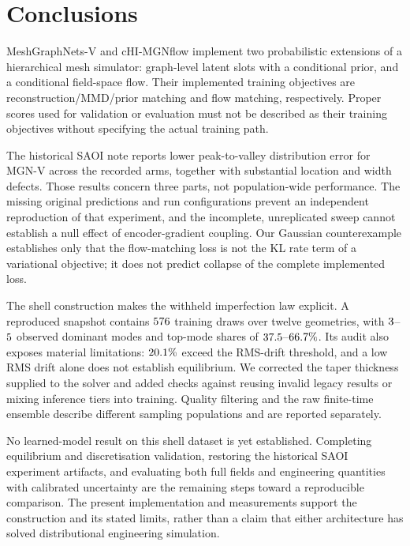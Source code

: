 \section{Conclusions}
\label{sec:conclusion}

MeshGraphNets-V and cHI-MGNflow implement two probabilistic extensions of a
hierarchical mesh simulator: graph-level latent slots with a conditional prior,
and a conditional field-space flow. Their implemented training objectives are
reconstruction/MMD/prior matching and flow matching, respectively. Proper
scores used for validation or evaluation must not be described as their
training objectives without specifying the actual training path.

The historical SAOI note reports lower peak-to-valley distribution error for
MGN-V across the recorded arms, together with substantial location and width
defects. Those results concern three parts, not population-wide performance.
The missing original predictions and run configurations prevent an independent
reproduction of that experiment, and the incomplete, unreplicated sweep cannot
establish a null effect of encoder-gradient coupling. Our Gaussian
counterexample establishes only that the flow-matching loss is not the KL
rate term of a variational objective; it does not predict collapse of the
complete implemented loss.

The shell construction makes the withheld imperfection law explicit. A
reproduced snapshot contains $576$ training draws over twelve
geometries, with $3$--$5$ observed dominant modes
and top-mode shares of $37.5$--$66.7\%$. Its audit also
exposes material limitations: $20.1\%$ exceed the RMS-drift
threshold, and a low RMS drift alone does not establish equilibrium. We
corrected the taper thickness supplied to the solver and added checks against
reusing invalid legacy results or mixing inference tiers into training.
Quality filtering and the raw finite-time ensemble describe different
sampling populations and are reported separately.

No learned-model result on this shell dataset is yet established. Completing
equilibrium and discretisation validation, restoring the historical SAOI
experiment artifacts, and evaluating both full fields and engineering
quantities with calibrated uncertainty are the remaining steps toward a
reproducible comparison. The present implementation and measurements support
the construction and its stated limits, rather than a claim that either
architecture has solved distributional engineering simulation.

